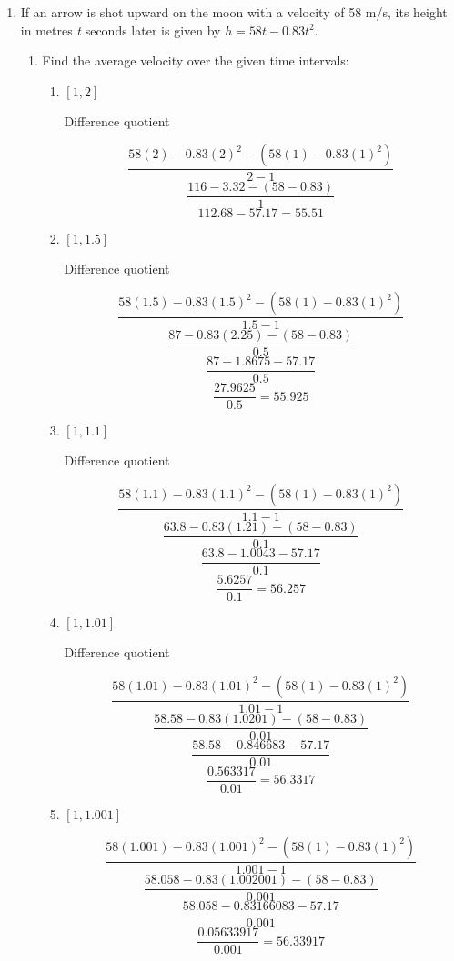\documentclass{article}
\begin{document}
\begin{enumerate}
		\item If an arrow is shot upward on the moon with a velocity of 58 m/s, its height in metres \emph{t} seconds
			later is given by $h = 58t - 0.83t^2$.
			
			\begin{enumerate}
			
				\item Find the average velocity over the given time intervals:
				
				\begin{enumerate}
					\item $[1, 2]$
					
						Difference quotient
						
						$$\frac{58(2) - 0.83(2)^2 - (58(1) - 0.83(1)^2)}{2 - 1}$$
						$$\frac{116 - 3.32 - (58 - 0.83)}{1}$$
						$$112.68 - 57.17 = 55.51$$
						
					\item $[1, 1.5]$
					
						Difference quotient
						
						$$\frac{58(1.5) - 0.83(1.5)^2 - (58(1) - 0.83(1)^2)}{1.5 - 1}$$
						$$\frac{87 - 0.83(2.25) - (58 - 0.83)}{0.5}$$
						$$\frac{87 - 1.8675 - 57.17}{0.5}$$
						$$\frac{27.9625}{0.5} = 55.925$$
						
					\item $[1, 1.1]$
					
						Difference quotient
						
						$$\frac{58(1.1) - 0.83(1.1)^2 - (58(1) - 0.83(1)^2)}{1.1 - 1}$$
						$$\frac{63.8 - 0.83(1.21) - (58 - 0.83)}{0.1}$$
						$$\frac{63.8 - 1.0043 - 57.17}{0.1}$$
						$$\frac{5.6257}{0.1} = 56.257$$
						
					\item $[1, 1.01]$
					
						Difference quotient
						
						$$\frac{58(1.01) - 0.83(1.01)^2 - (58(1) - 0.83(1)^2)}{1.01 - 1}$$
						$$\frac{58.58 - 0.83(1.0201) - (58 - 0.83)}{0.01}$$
						$$\frac{58.58 - 0.846683 - 57.17}{0.01}$$
						$$\frac{0.563317}{0.01} = 56.3317$$

					\item $[1, 1.001]$
					
						$$\frac{58(1.001) - 0.83(1.001)^2 -  (58(1) - 0.83(1)^2)}{1.001 - 1}$$
						$$\frac{58.058 - 0.83(1.002001) -  (58 - 0.83)}{0.001}$$
						$$\frac{58.058 - 0.83166083 - 57.17}{0.001}$$
						$$\frac{0.05633917}{0.001} = 56.33917$$
						

\end{enumerate}
\end{enumerate}
\end{enumerate}
\end{document}
